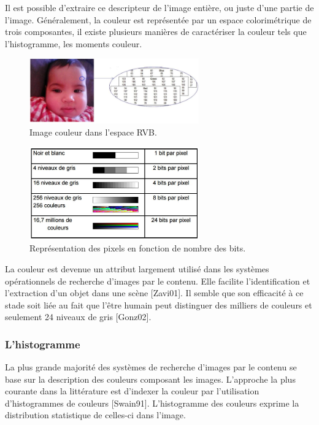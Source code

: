 Il est possible d’extraire ce descripteur de l’image entière, ou juste d’une partie de l’image. Généralement, la couleur est représentée par un espace colorimétrique de trois composantes, il existe plusieurs manières de caractériser la couleur tels que l’histogramme, les
moments couleur.

\begin{figure}[H]
	\label{fig:imageRVB}
	\centering
	\includegraphics[width=0.65\textwidth]{Figures/imageRVB} %
	
	\caption{Image couleur dans l’espace RVB.}
	
\end{figure}

\begin{figure}[H]
	\label{fig:tableRVB}
	\centering
	\includegraphics[width=0.65\textwidth]{Figures/tableRVB} %
	
	\caption{Représentation des pixels en fonction de nombre des bits.}
	
\end{figure}

La couleur est devenue un attribut largement utilisé dans les systèmes opérationnels de recherche d'images par le contenu. Elle facilite l'identification et l'extraction d'un objet dans une scène [Zavi01]. Il semble que son efficacité à ce stade soit liée au fait que l'être humain peut distinguer des milliers de couleurs et seulement 24 niveaux de gris [Gonz02].

\subsubsection{L'histogramme}
La plus grande majorité des systèmes de recherche d'images par le contenu se base sur la description des couleurs composant les images. L’approche la plus courante dans la littérature est d'indexer la couleur par l'utilisation d'histogrammes de couleurs [Swain91]. L'histogramme des couleurs exprime la distribution statistique de celles-ci dans l'image.


